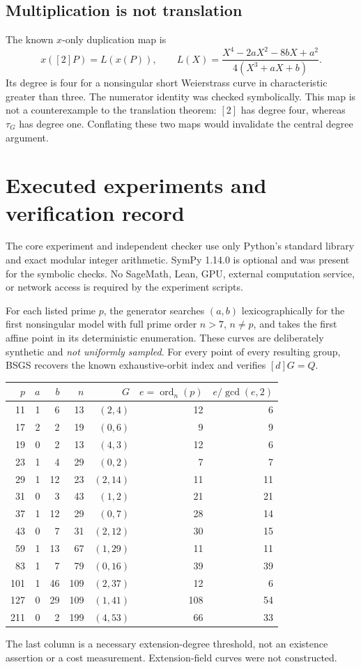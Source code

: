 \documentclass[11pt,letterpaper]{article}
\theoremstyle{definition}
\theoremstyle{remark}
\newcommand{\ord}{\operatorname{ord}}
\newcommand{\tauG}{\tau_G}
\begin{document}
\subsection{Multiplication is not translation}

The known $x$-only duplication map is
\[
x([2]P)=L(x(P)),\qquad
L(X)=\frac{X^4-2aX^2-8bX+a^2}{4(X^3+aX+b)}.
\]
Its degree is four for a nonsingular short Weierstrass curve in characteristic greater than three. The numerator identity was checked symbolically. This map is not a counterexample to the translation theorem: $[2]$ has degree four, whereas $\tauG$ has degree one. Conflating these two maps would invalidate the central degree argument.

\section{Executed experiments and verification record}\label{sec:experiments}

The core experiment and independent checker use only Python's standard library and exact modular integer arithmetic. SymPy 1.14.0 is optional and was present for the symbolic checks. No SageMath, Lean, GPU, external computation service, or network access is required by the experiment scripts.

For each listed prime $p$, the generator searches $(a,b)$ lexicographically for the first nonsingular model with full prime order $n>7$, $n\ne p$, and takes the first affine point in its deterministic enumeration. These curves are deliberately synthetic and \emph{not uniformly sampled}. For every point of every resulting group, BSGS recovers the known exhaustive-orbit index and verifies $[d]G=Q$.

\begin{center}
\small
\begin{tabular}{rrrrrrr}
\toprule
$p$ & $a$ & $b$ & $n$ & $G$ & $e=\ord_n(p)$ & $e/\gcd(e,2)$\\
\midrule
11&1&6&13&$(2,4)$&12&6\\
17&2&2&19&$(0,6)$&9&9\\
19&0&2&13&$(4,3)$&12&6\\
23&1&4&29&$(0,2)$&7&7\\
29&1&12&23&$(2,14)$&11&11\\
31&0&3&43&$(1,2)$&21&21\\
37&1&12&29&$(0,7)$&28&14\\
43&0&7&31&$(2,12)$&30&15\\
59&1&13&67&$(1,29)$&11&11\\
83&1&7&79&$(0,16)$&39&39\\
101&1&46&109&$(2,37)$&12&6\\
127&0&29&109&$(1,41)$&108&54\\
211&0&2&199&$(4,53)$&66&33\\
\bottomrule
\end{tabular}
\end{center}
The last column is a necessary extension-degree threshold, not an existence assertion or a cost measurement. Extension-field curves were not constructed.
\end{document}

